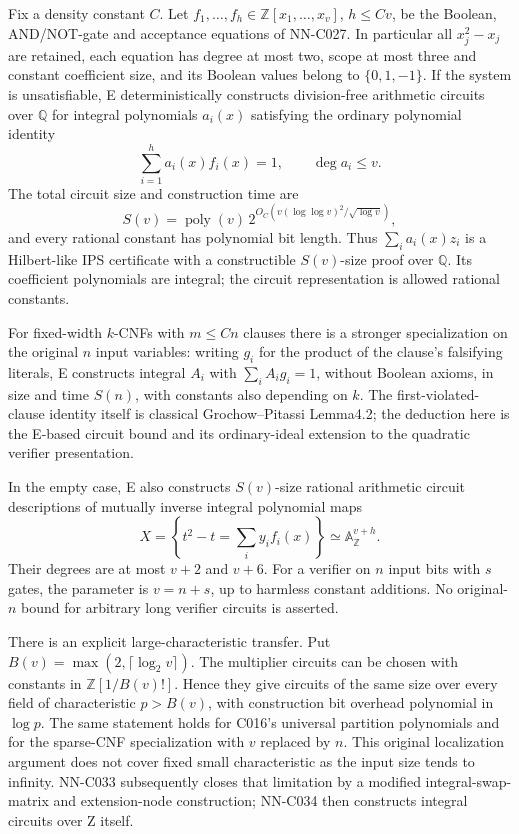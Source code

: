 \begin{proposition}[NN-C029]
Fix a density constant $C$. Let $f_1,\ldots,f_h\in\mathbb Z[x_1,\ldots,x_v]$, $h\leq Cv$, be the Boolean, AND/NOT-gate and acceptance equations of NN-C027. In particular all $x_j^2-x_j$ are retained, each equation has degree at most two, scope at most three and constant coefficient size, and its Boolean values belong to $\{0,1,-1\}$. If the system is unsatisfiable, E deterministically constructs division-free arithmetic circuits over $\mathbb Q$ for integral polynomials $a_i(x)$ satisfying the ordinary polynomial identity
\[
                  \sum_{i=1}^h a_i(x)f_i(x)=1,
          \qquad \deg a_i\leq v.
\]
The total circuit size and construction time are
\[
 S(v)=\operatorname{poly}(v)\,
 2^{O_C(v(\log\log v)^2/\sqrt{\log v})},
\]
and every rational constant has polynomial bit length. Thus $\sum_i a_i(x)z_i$ is a Hilbert-like IPS certificate with a constructible $S(v)$-size proof over $\mathbb Q$. Its coefficient polynomials are integral; the circuit representation is allowed rational constants.

For fixed-width $k$-CNFs with $m\leq Cn$ clauses there is a stronger specialization on the original $n$ input variables: writing $g_i$ for the product of the clause's falsifying literals, E constructs integral $A_i$ with $\sum_i A_i g_i=1$, without Boolean axioms, in size and time $S(n)$, with constants also depending on $k$. The first-violated-clause identity itself is classical Grochow--Pitassi Lemma4.2; the deduction here is the E-based circuit bound and its ordinary-ideal extension to the quadratic verifier presentation.

In the empty case, E also constructs $S(v)$-size rational arithmetic circuit descriptions of mutually inverse integral polynomial maps
\[
 X=\left\{t^2-t=\sum_i y_i f_i(x)\right\}
       \simeq\mathbb A^{v+h}_{\mathbb Z}.
\]
Their degrees are at most $v+2$ and $v+6$. For a verifier on $n$ input bits with $s$ gates, the parameter is $v=n+s$, up to harmless constant additions. No original-$n$ bound for arbitrary long verifier circuits is asserted.

There is an explicit large-characteristic transfer. Put
$B(v)=\max(2,\lceil\log_2 v\rceil)$. The multiplier circuits can be chosen with constants in $\mathbb Z[1/B(v)!]$. Hence they give circuits of the same size over every field of characteristic $p>B(v)$, with construction bit overhead polynomial in $\log p$. The same statement holds for C016's universal partition polynomials and for the sparse-CNF specialization with $v$ replaced by $n$. This original localization argument does not cover fixed small characteristic as the input size tends to infinity. NN-C033 subsequently closes that limitation by a modified integral-swap-matrix and extension-node construction; NN-C034 then constructs integral circuits over Z itself.
\end{proposition}
